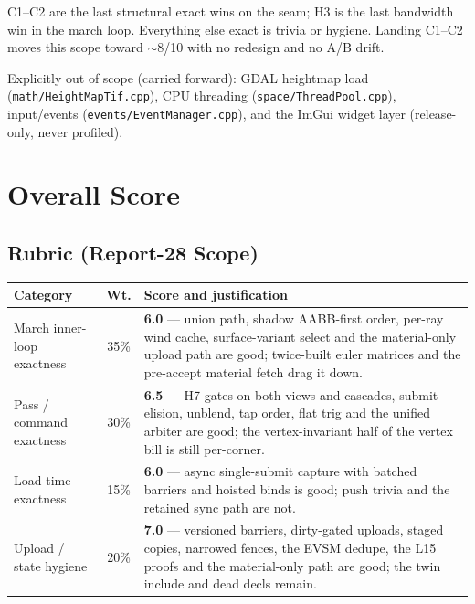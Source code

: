 \documentclass[11pt,a4paper]{article}
\begin{document}
C1--C2 are the last structural exact wins on the seam; H3 is the last
bandwidth win in the march loop. Everything else exact is trivia or
hygiene. Landing C1--C2 moves this scope toward $\sim$8/10 with no
redesign and no A/B drift.

Explicitly out of scope (carried forward): GDAL heightmap load
(\texttt{math/HeightMapTif.cpp}), CPU threading
(\texttt{space/ThreadPool.cpp}), input/events
(\texttt{events/EventManager.cpp}), and the ImGui widget layer
(release-only, never profiled).

\section{Overall Score}
\label{sec:score28}

\subsection{Rubric (Report-28 Scope)}

\begin{table}[h]
\centering
\small
\begin{tabular}{@{}lcp{7.2cm}@{}}
\toprule
\textbf{Category} & \textbf{Wt.} & \textbf{Score and justification} \\
\midrule
March inner-loop exactness & 35\% & \textbf{6.0} --- union path, shadow
AABB-first order, per-ray wind cache, surface-variant select and the
material-only upload path are good; twice-built euler matrices and the
pre-accept material fetch drag it down. \\
Pass / command exactness & 30\% & \textbf{6.5} --- H7 gates on both views
and cascades, submit elision, unblend, tap order, flat trig and the unified
arbiter are good; the vertex-invariant half of the vertex bill is still
per-corner. \\
Load-time exactness & 15\% & \textbf{6.0} --- async single-submit capture
with batched barriers and hoisted binds is good; push trivia and the
retained sync path are not. \\
Upload / state hygiene & 20\% & \textbf{7.0} --- versioned barriers,
dirty-gated uploads, staged copies, narrowed fences, the EVSM dedupe, the
L15 proofs and the material-only path are good; the twin include and dead
decls remain. \\
\bottomrule
\end{tabular}
\end{table}
\end{document}
